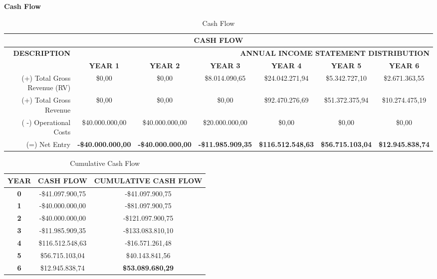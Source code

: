 \textbf{Cash Flow}

\begin{table}[H]
  \tiny
  \centering
  \caption{Cash Flow}
    \begin{tabular}{rcccccc}
    \toprule
    \multicolumn{7}{c}{\textbf{CASH FLOW}} \\
    \midrule
    \multicolumn{1}{r}{\multirow{2}[4]{*}{\textbf{DESCRIPTION}}} & \multicolumn{6}{r}{\textbf{ ANNUAL INCOME STATEMENT DISTRIBUTION}} \\
    \multicolumn{1}{r}{} & \textbf{YEAR 1} & \textbf{YEAR 2} & \textbf{YEAR 3} & \textbf{YEAR 4} & \textbf{YEAR 5} & \textbf{YEAR 6} \\
    (+) Total Gross Revenue (RV) & \$0,00 & \$0,00 & \$8.014.090,65 & \$24.042.271,94 & \$5.342.727,10 & \$2.671.363,55 \\
    (+) Total Gross Revenue & \$0,00 & \$0,00 & \$0,00 & \$92.470.276,69 & \$51.372.375,94 & \$10.274.475,19 \\
    ( -) Operational Costs & \$40.000.000,00 & \$40.000.000,00 & \$20.000.000,00 & \$0,00 & \$0,00 & \$0,00 \\
    (=) Net Entry & \textbf{-\$40.000.000,00} & \textbf{-\$40.000.000,00} & \textbf{-\$11.985.909,35} & \textbf{\$116.512.548,63} & \textbf{\$56.715.103,04} & \textbf{\$12.945.838,74} \\
    \bottomrule
    \end{tabular}%
  \label{tab:cashFlowAcionista}%
\end{table}%

\begin{table}[H]
  \centering
  \caption{Cumulative Cash Flow}
    \begin{tabular}{ccc}
    \toprule
    \textbf{YEAR} & \textbf{CASH FLOW} & \textbf{CUMULATIVE CASH FLOW} \\
    \midrule
    \textbf{0} & -\$41.097.900,75 & -\$41.097.900,75 \\
    \textbf{1} & -\$40.000.000,00 & -\$81.097.900,75 \\
    \textbf{2} & -\$40.000.000,00 & -\$121.097.900,75 \\
    \textbf{3} & -\$11.985.909,35 & -\$133.083.810,10 \\
    \textbf{4} & \$116.512.548,63 & -\$16.571.261,48 \\
    \textbf{5} & \$56.715.103,04 & \$40.143.841,56 \\
    \textbf{6} & \$12.945.838,74 & \textbf{\$53.089.680,29} \\
    \bottomrule
    \end{tabular}%
  \label{tab:financeCumulativeCashFlowShare}%
\end{table}%


